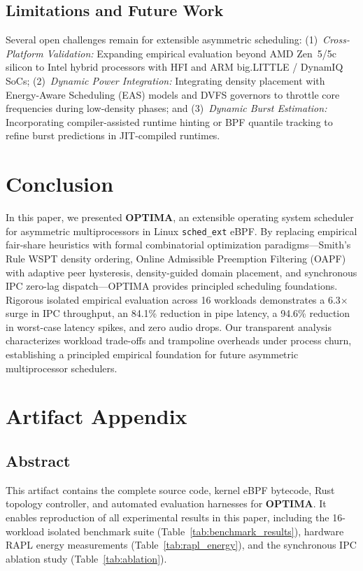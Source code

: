 \documentclass[letterpaper,twocolumn,10pt]{article}
\begin{document}
\subsection{Limitations and Future Work}
Several open challenges remain for extensible asymmetric scheduling: (1)~\emph{Cross-Platform Validation:} Expanding empirical evaluation beyond AMD Zen~5/5c silicon to Intel hybrid processors with HFI and ARM big.LITTLE / DynamIQ SoCs; (2)~\emph{Dynamic Power Integration:} Integrating density placement with Energy-Aware Scheduling (EAS) models and DVFS governors to throttle core frequencies during low-density phases; and (3)~\emph{Dynamic Burst Estimation:} Incorporating compiler-assisted runtime hinting or BPF quantile tracking to refine burst predictions in JIT-compiled runtimes.

\section{Conclusion}
\label{sec:conclusion}

In this paper, we presented \textbf{OPTIMA}, an extensible operating system scheduler for asymmetric multiprocessors in Linux \texttt{sched\_ext} eBPF. By replacing empirical fair-share heuristics with formal combinatorial optimization paradigms---Smith's Rule WSPT density ordering, Online Admissible Preemption Filtering (OAPF) with adaptive peer hysteresis, density-guided domain placement, and synchronous IPC zero-lag dispatch---OPTIMA provides principled scheduling foundations. Rigorous isolated empirical evaluation across 16 workloads demonstrates a 6.3$\times$ surge in IPC throughput, an 84.1\% reduction in pipe latency, a 94.6\% reduction in worst-case latency spikes, and zero audio drops. Our transparent analysis characterizes workload trade-offs and trampoline overheads under process churn, establishing a principled empirical foundation for future asymmetric multiprocessor schedulers.





\appendix
\section{Artifact Appendix}
\label{sec:artifact_appendix}

\subsection{Abstract}
This artifact contains the complete source code, kernel eBPF bytecode, Rust topology controller, and automated evaluation harnesses for \textbf{OPTIMA}. It enables reproduction of all experimental results in this paper, including the 16-workload isolated benchmark suite (Table~\ref{tab:benchmark_results}), hardware RAPL energy measurements (Table~\ref{tab:rapl_energy}), and the synchronous IPC ablation study (Table~\ref{tab:ablation}).
\end{document}
